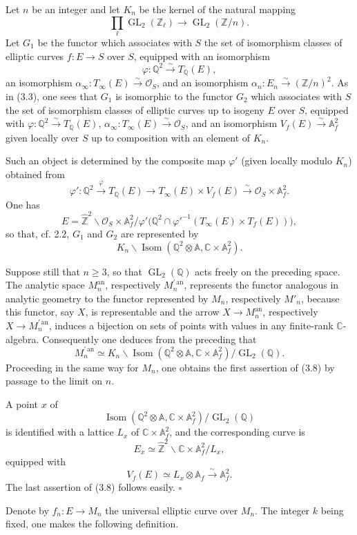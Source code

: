 \documentclass[10pt]{article}
\newcommand{\A}{\mathbb A}
\newcommand{\Af}{\mathbb A_f}
\newcommand{\C}{\mathbb C}
\newcommand{\Q}{\mathbb Q}
\newcommand{\Z}{\mathbb Z}
\newcommand{\bZ}{\widehat{\mathbb Z}}
\newcommand{\GL}{\operatorname{GL}}
\newcommand{\Isom}{\operatorname{Isom}}
\newcommand{\cO}{\mathcal O}
\newcommand{\an}{\mathrm{an}}
\newcommand{\QED}{\hfill$\square$}
\begin{document}
Let $n$ be an integer and let $K_n$ be the kernel of the natural mapping
\[
\prod_\ell \GL_2(\Z_\ell)\to \GL_2(\Z/n).
\]
Let $G_1$ be the functor which associates with $S$ the set of isomorphism classes of elliptic
curves $f:E\to S$ over $S$, equipped with an isomorphism
\[
\varphi:\Q^2\xrightarrow{\sim}T_\Q(E),
\]
an isomorphism $\alpha_\infty:T_\infty(E)\xrightarrow{\sim}\cO_S$, and an isomorphism
$\alpha_n:E_n\xrightarrow{\sim}(\Z/n)^2$. As in (3.3), one sees that $G_1$ is isomorphic
to the functor $G_2$ which associates with $S$ the set of isomorphism classes of elliptic
curves up to isogeny $E$ over $S$, equipped with $\varphi:\Q^2\xrightarrow{\sim}T_\Q(E)$,
$\alpha_\infty:T_\infty(E)\xrightarrow{\sim}\cO_S$, and an isomorphism
$V_f(E)\xrightarrow{\sim}\Af^2$ given locally over $S$ up to composition with an element
of $K_n$.

Such an object is determined by the composite map $\varphi'$ (given locally modulo $K_n$)
obtained from
\[
\varphi':\Q^2\xrightarrow{\varphi}T_\Q(E)
\longrightarrow T_\infty(E)\times V_f(E)
\xrightarrow{\sim}\cO_S\times \Af^2.
\]
One has
\[
E=\bZ^2\backslash \cO_S\times \Af^2/
\varphi'\bigl(\Q^2\cap \varphi'^{-1}(T_\infty(E)\times T_f(E))\bigr),
\]
so that, cf. 2.2, $G_1$ and $G_2$ are represented by
\[
K_n\backslash\Isom(\Q^2\otimes\A,\C\times\Af^2).
\]

Suppose still that $n\ge 3$, so that $\GL_2(\Q)$ acts freely on the preceding space. The
analytic space $M_n^{\an}$, respectively $M_n^{\prime\,\an}$, represents the functor analogous
in analytic geometry to the functor represented by $M_n$, respectively $M'_n$, because this
functor, say $X$, is representable and the arrow $X\to M_n^{\an}$, respectively
$X\to M_n^{\prime\,\an}$, induces a bijection on sets of points with values in any finite-rank
$\C$-algebra. Consequently one deduces from the preceding that
\[
M_n^{\prime\,\an}\simeq
K_n\backslash\Isom(\Q^2\otimes\A,\C\times\Af^2)/\GL_2(\Q).
\]
Proceeding in the same way for $M_n$, one obtains the first assertion of (3.8) by passage
to the limit on $n$.

A point $x$ of
\[
\Isom(\Q^2\otimes\A,\C\times\Af^2)/\GL_2(\Q)
\]
is identified with a lattice $L_x$ of $\C\times\Af^2$, and the corresponding curve is
\[
E_x\simeq \bZ^2\backslash \C\times\Af^2/L_x,
\]
equipped with
\[
V_f(E)\simeq L_x\otimes\Af\xrightarrow{\sim}\Af^2.
\]
The last assertion of (3.8) follows easily. \QED

Denote by $f_n:E\to M_n$ the universal elliptic curve over $M_n$. The integer $k$ being
fixed, one makes the following definition.
\end{document}
